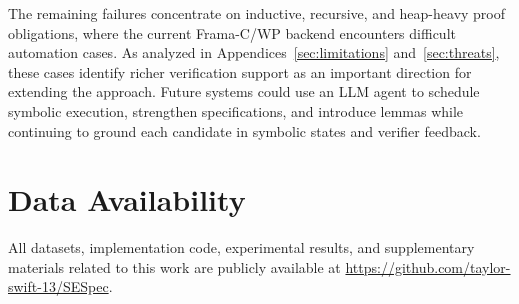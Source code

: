 \documentclass[lettersize,journal]{IEEEtran}
\newcommand{\apptworef}[2]{Appendices~\ref{#1} and~\ref{#2}}
\begin{document}
{The remaining failures concentrate on inductive, recursive, and heap-heavy proof obligations, where the current Frama-C/WP backend encounters difficult automation cases. As analyzed in \apptworef{sec:limitations}{sec:threats}, these cases identify richer verification support as an important direction for extending the approach. Future systems could use an LLM agent to schedule symbolic execution, strengthen specifications, and introduce lemmas while continuing to ground each candidate in symbolic states and verifier feedback.}


\section*{Data Availability}
All datasets, implementation code, experimental results, and supplementary materials related to this work are publicly available at \url{https://github.com/taylor-swift-13/SESpec}.





\clearpage
\appendices
\raggedbottom












\end{document}
